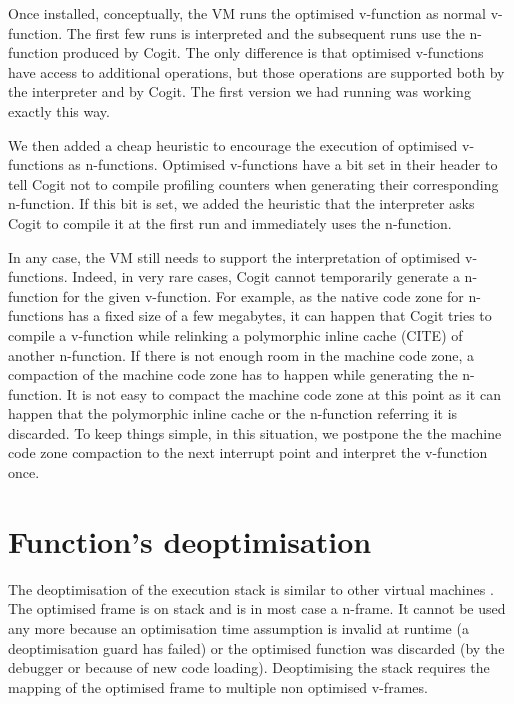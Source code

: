 \documentclass[a4paper,12pt,twoside]{../includes/ThesisStyle}
\begin{document}
Once installed, conceptually, the VM runs the optimised v-function as normal v-function. The first few runs is interpreted and the subsequent runs use the n-function produced by Cogit. The only difference is that optimised v-functions have access to additional operations, but those operations are supported both by the interpreter and by Cogit. The first version we had running was working exactly this way.

We then added a cheap heuristic to encourage the execution of optimised v-functions as n-functions. Optimised v-functions have a bit set in their header to tell Cogit not to compile profiling counters when generating their corresponding n-function. If this bit is set, we added the heuristic that the interpreter asks Cogit to compile it at the first run and immediately uses the n-function. 

In any case, the VM still needs to support the interpretation of optimised v-functions. Indeed, in very rare cases, Cogit cannot temporarily generate a n-function for the given v-function. For example, as the native code zone for n-functions has a fixed size of a few megabytes, it can happen that Cogit tries to compile a v-function while relinking a polymorphic inline cache (CITE) of another n-function. If there is not enough room in the machine code zone, a compaction of the machine code zone has to happen while generating the n-function. It is not easy to compact the machine code zone at this point as it can happen that the polymorphic inline cache or the n-function referring it is discarded. To keep things simple, in this situation, we postpone the the machine code zone compaction to the next interrupt point and interpret the v-function once.


\section {Function's deoptimisation}

The deoptimisation of the execution stack is similar to other virtual machines \cite{Fin03a, Holz92a}. The optimised frame is on stack and is in most case a n-frame. It cannot be used any more because an optimisation time assumption is invalid at runtime (a deoptimisation guard has failed) or the optimised function was discarded (by the debugger or because of new code loading). Deoptimising the stack requires the mapping of the optimised frame to multiple non optimised v-frames. 
\end{document}
